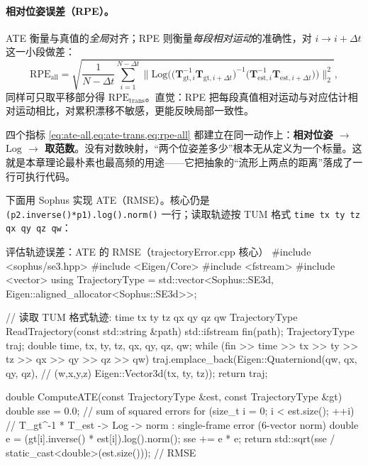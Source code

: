 \paragraph{相对位姿误差（RPE）。}ATE 衡量与真值的\emph{全局}对齐；RPE 则衡量\emph{每段相对运动}的准确性，对 $i\to i+\Delta t$ 这一小段做差：
\begin{equation}
  \mathrm{RPE}_{\text{all}}=\sqrt{\frac{1}{N-\Delta t}\sum_{i=1}^{N-\Delta t}\Big\|\mathrm{Log}\Big(\big(\mathbf{T}_{\mathrm{gt},i}^{-1}\mathbf{T}_{\mathrm{gt},i+\Delta t}\big)^{-1}\big(\mathbf{T}_{\mathrm{est},i}^{-1}\mathbf{T}_{\mathrm{est},i+\Delta t}\big)\Big)\Big\|_2^2},
  \label{eq:rpe-all}
\end{equation}
同样可只取平移部分得 $\mathrm{RPE}_{\text{trans}}$。直觉：RPE 把每段真值相对运动与对应估计相对运动相比，对累积漂移不敏感，更能反映局部一致性。

\begin{insight}
四个指标 \cref{eq:ate-all,eq:ate-trans,eq:rpe-all} 都建立在同一动作上：\textbf{相对位姿 $\to$ $\mathrm{Log}$ $\to$ 取范数}。没有对数映射，“两个位姿差多少”根本无从定义为一个标量。这就是本章理论最朴素也最高频的用途——它把抽象的“流形上两点的距离”落成了一行可执行代码。
\end{insight}

下面用 Sophus 实现 ATE（RMSE）。核心仍是 \texttt{(p2.inverse()*p1).log().norm()} 一行；读取轨迹按 TUM 格式 \texttt{time tx ty tz qx qy qz qw}：

\begin{codebox}[C++]{评估轨迹误差：ATE 的 RMSE（trajectoryError.cpp 核心）}
#include <sophus/se3.hpp>
#include <Eigen/Core>
#include <fstream>
#include <vector>
using TrajectoryType =
    std::vector<Sophus::SE3d, Eigen::aligned_allocator<Sophus::SE3d>>;

// 读取 TUM 格式轨迹: time tx ty tz qx qy qz qw
TrajectoryType ReadTrajectory(const std::string &path) {
  std::ifstream fin(path);
  TrajectoryType traj;
  double time, tx, ty, tz, qx, qy, qz, qw;
  while (fin >> time >> tx >> ty >> tz >> qx >> qy >> qz >> qw)
    traj.emplace_back(Eigen::Quaterniond(qw, qx, qy, qz),  // (w,x,y,z)
                      Eigen::Vector3d(tx, ty, tz));
  return traj;
}

double ComputeATE(const TrajectoryType &est, const TrajectoryType &gt) {
  double sse = 0.0;                       // sum of squared errors
  for (size_t i = 0; i < est.size(); ++i) {
    // T_gt^-1 * T_est -> Log -> norm : single-frame error (6-vector norm)
    double e = (gt[i].inverse() * est[i]).log().norm();
    sse += e * e;
  }
  return std::sqrt(sse / static_cast<double>(est.size()));   // RMSE
}
\end{codebox}

